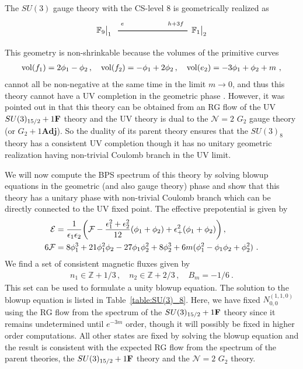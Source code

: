 The $SU(3)$ gauge theory with the CS-level $ 8 $ is geometrically realized as
\begin{align}\label{fig:SU3_8}
\begin{tikzpicture}
\draw[thick](-3,0)--(0,0);	
\node at(-3.6,0) {$\mathbb{F}_{9}{}\big|_1$};
\node at(-2.8,0.3) {${}_e$};
\node at(0.5,0) {$\mathbb{F}_{1}{}\big|_2$};
\node at(-0.5,0.3) {${}_{h+3f}$};
\end{tikzpicture}
\end{align}
This geometry is non-shrinkable because the volumes of  the primitive curves
\begin{align}\label{eq:SU3_8_vol}
\operatorname{vol} (f_1) = 2\phi_1 - \phi_2 \, , \quad
\operatorname{vol} (f_2) = -\phi_1 + 2\phi_2 \, , \quad
\operatorname{vol} (e_2) = -3\phi_1 + \phi_2 + m\ ,
\end{align}
cannot all be non-negative at the same time in the limit $m\rightarrow0$, and thus this theory cannot have a UV completion in the geometric phase \cite{Jefferson:2018irk}. However, it was pointed out in \cite{Bhardwaj:2019jtr} that this theory can be obtained from an RG flow of the UV $SU(3)_{15/2}+1{\bf F}$ theory and the UV theory is dual to the $\mathcal{N}=2$ $G_2$ gauge theory (or $G_2+1\mathbf{Adj}$). So the duality of its parent theory ensures that the $SU(3)_8$ theory has a consistent UV completion though it has no unitary geometric realization having non-trivial Coulomb branch in the UV limit.

We will now compute the BPS spectrum of this theory by solving blowup equations in the geometric (and also gauge theory) phase and show that this theory has a unitary phase with non-trivial Coulomb branch which can be directly connected to the UV fixed point. The effective prepotential is given by
\begin{align}
\mathcal{E} &= \frac{1}{\epsilon_1 \epsilon_2} \qty(\mathcal{F} - \frac{\epsilon_1^2 + \epsilon_2^2}{12}(\phi_1 + \phi_2) + \epsilon_+^2 (\phi_1 + \phi_2)) \, , \nonumber \\
6\mathcal{F} &= 8\phi_1^3 + 21\phi_1^2 \phi_2 - 27\phi_1 \phi_2^2 + 8\phi_2^3 + 6m (\phi_1^2 - \phi_1 \phi_2 + \phi_2^2) \ .
\end{align}
We find a set of consistent magnetic fluxes given by
\begin{align}
n_1 \in \mathbb{Z} + 1/3 \, , \quad
n_2 \in \mathbb{Z} + 2/3 \, , \quad
B_{m} = -1/6 \ .
\end{align}
This set can be used to formulate a unity blowup equation. The solution to the blowup equation is listed in Table~\ref{table:SU(3)_8}. Here, we have fixed $N^{(1,1,0)}_{0,0}$ using the RG flow from the spectrum of the $SU(3)_{15/2}+1{\bf F}$ theory since it remains undetermined until $e^{-3m}$ order, though it will possibly be fixed in higher order computations. All other states are fixed by solving the blowup equation and the result is consistent with the expected RG flow from the spectrum of the  parent theories, the $SU(3)_{15/2}+1{\bf F}$ theory and the $\mathcal{N}=2$ $G_2$ theory.

